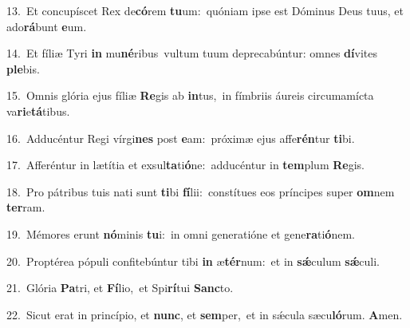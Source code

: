 {\numbfont\textcolor{\numbcolor}{13.}}~Et concupíscet Rex de\-\textbf{có}\-rem \textbf{tu}\-um:~\star quóniam ipse est Dóminus Deus tuus, et ado\-\textbf{rá}\-bunt \textbf{e}\-um.\par
{\numbfont\textcolor{\numbcolor}{14.}}~Et fíliæ Tyri \textbf{in} mu\-\textbf{né}\-ribus~\star vultum tuum deprecabúntur: omnes \textbf{dí}\-vites \textbf{ple}\-bis.\par
{\numbfont\textcolor{\numbcolor}{15.}}~Omnis glória ejus fíliæ \textbf{Re}\-gis ab \textbf{in}\-tus,~\star in fímbriis áureis circumamícta va\-\textbf{ri}\-e\-\textbf{tá}\-tibus.\par
{\numbfont\textcolor{\numbcolor}{16.}}~Adducéntur Regi vírgi\textbf{nes} post \textbf{e}\-am:~\star próximæ ejus affe\-\textbf{rén}\-tur \textbf{ti}\-bi.\par
{\numbfont\textcolor{\numbcolor}{17.}}~Afferéntur in lætítia et exsul\-\textbf{ta}\-ti\-\textbf{ó}\-ne:~\star adducéntur in \textbf{tem}\-plum \textbf{Re}\-gis.\par
{\numbfont\textcolor{\numbcolor}{18.}}~Pro pátribus tuis nati sunt \textbf{ti}\-bi \textbf{fí}\-lii:~\star constítues eos príncipes super \textbf{om}\-nem \textbf{ter}\-ram.\par
{\numbfont\textcolor{\numbcolor}{19.}}~Mémores erunt \textbf{nó}\-minis \textbf{tu}\-i:~\star in omni generatióne et gene\-\textbf{ra}\-ti\-\textbf{ó}\-nem.\par
{\numbfont\textcolor{\numbcolor}{20.}}~Proptérea pópuli confitebúntur tibi \textbf{in} æ\-\textbf{tér}\-num:~\star et in \textbf{sǽ}\-culum \textbf{sǽ}\-culi.\par
{\numbfont\textcolor{\numbcolor}{21.}}~Glória \textbf{Pa}\-tri, et \textbf{Fí}\-lio,~\star et Spi\-\textbf{rí}\-tui \textbf{Sanc}\-to.\par
{\numbfont\textcolor{\numbcolor}{22.}}~Sicut erat in princípio, et \textbf{nunc}\-, et \textbf{sem}\-per,~\star et in sǽcula sæcu\-\textbf{ló}\-rum. \textbf{A}\-men.\par
